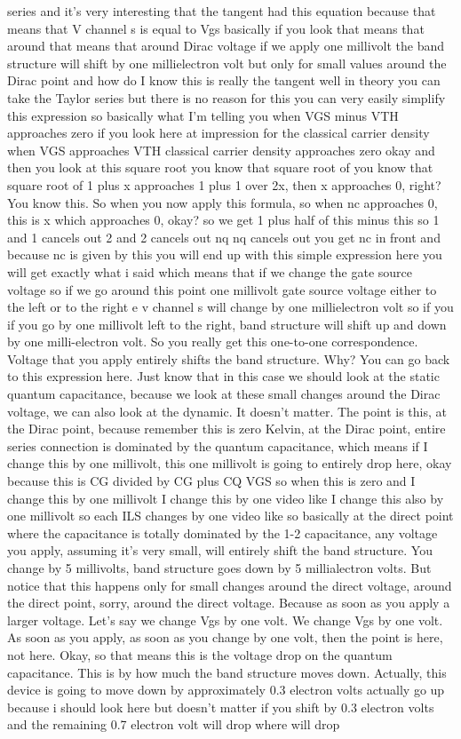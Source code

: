 series and it's very interesting that the tangent had this equation because that means that V channel s is equal to Vgs basically if you look that means that around that means that around Dirac voltage if we apply one millivolt the band structure will shift by one millielectron volt but only for small values around the Dirac point and how do I know this is really the tangent well in theory you can take the Taylor series but there is no reason for this you can very easily simplify this expression so basically what I'm telling you when VGS minus VTH approaches zero if you look here at impression for the classical carrier density when VGS approaches VTH classical carrier density approaches zero okay and then you look at this square root you know that square root of you know that square root of 1 plus x approaches 1 plus 1 over 2x, then x approaches 0, right? You know this. So when you now apply this formula, so when nc approaches 0, this is x which approaches 0, okay? so we get 1 plus half of this minus this so 1 and 1 cancels out 2 and 2 cancels out nq nq cancels out you get nc in front and because nc is given by this you will end up with this simple expression here you will get exactly what i said which means that if we change the gate source voltage so if we go around this point one millivolt gate source voltage either to the left or to the right e v channel s will change by one millielectron volt so if you if you go by one millivolt left to the right, band structure will shift up and down by one milli-electron volt. So you really get this one-to-one correspondence. Voltage that you apply entirely shifts the band structure. Why? You can go back to this expression here. Just know that in this case we should look at the static quantum capacitance, because we look at these small changes around the Dirac voltage, we can also look at the dynamic. It doesn't matter. The point is this, at the Dirac point, because remember this is zero Kelvin, at the Dirac point, entire series connection is dominated by the quantum capacitance, which means if I change this by one millivolt, this one millivolt is going to entirely drop here, okay because this is CG divided by CG plus CQ VGS so when this is zero and I change this by one millivolt I change this by one video like I change this also by one millivolt so each ILS changes by one video like so basically at the direct point where the capacitance is totally dominated by the 1-2 capacitance, any voltage you apply, assuming it's very small, will entirely shift the band structure. You change by 5 millivolts, band structure goes down by 5 millialectron volts. But notice that this happens only for small changes around the direct voltage, around the direct point, sorry, around the direct voltage. Because as soon as you apply a larger voltage. Let's say we change Vgs by one volt. We change Vgs by one volt. As soon as you apply, as soon as you change by one volt, then the point is here, not here. Okay, so that means this is the voltage drop on the quantum capacitance. This is by how much the band structure moves down. Actually, this device is going to move down by approximately 0.3 electron volts actually go up because i should look here but doesn't matter if you shift by 0.3 electron volts and the remaining 0.7 electron volt will drop where will drop 